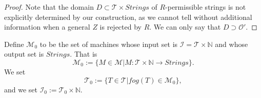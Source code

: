 \documentclass{amsart}  %
\numberwithin{equation}{section}
\newtheorem{definition}[equation]{Definition}
\theoremstyle{definition}
\theoremstyle{remark}
\begin{document}
{\begin{proof}
   Note that the domain $D \subset \mathcal{T} \times Strings$ of $R$-permissible strings is not explicitly determined by our construction, as we cannot tell without additional information when a general $Z$ is rejected by $R$. We can only say that $D \supset \mathcal{O}'$. 
\end{proof}
Define $\mathcal{M} _{0} $ to be the set of machines whose input set is $\mathcal{I}= \mathcal{T}  \times \mathbb{N}$ and whose output set is $Strings $. That is $$\mathcal{M} _{0} := \{M \in \mathcal{M}| M: \mathcal{T} \times \mathbb{N}  \to Strings \}.
$$ 
We set $$\mathcal{T} _{0}:= \{T \in \mathcal{T}| fog (T) \in \mathcal{M} _{0} \},
$$ and we set $\mathcal{I} _{0} := \mathcal{T} _{0} \times \mathbb{N}  $.  %
}
\end{document}
